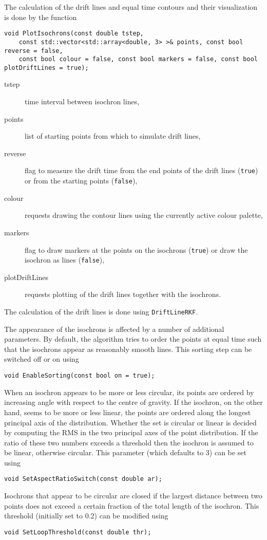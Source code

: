 The calculation of the drift lines and equal time contours and their visualization is 
done by the function 
\begin{lstlisting}
void PlotIsochrons(const double tstep,
    const std::vector<std::array<double, 3> >& points, const bool reverse = false,
    const bool colour = false, const bool markers = false, const bool plotDriftLines = true);
\end{lstlisting}
\begin{description}
  \item[tstep] time interval between isochron lines,
  \item[points] list of starting points from which to simulate drift lines,
  \item[reverse] flag to measure the drift time from the end points of the drift lines (\texttt{true}) or from the starting points (\texttt{false}),
  \item[colour] requests drawing the contour lines using the currently active colour palette,
  \item[markers] flag to draw markers at the points on the isochrons (\texttt{true}) or draw the isochron as lines (\texttt{false}), 
  \item[plotDriftLines] requests plotting of the drift lines together with the isochrons. 
\end{description} 
The calculation of the drift lines is done using \texttt{DriftLineRKF}.

The appearance of the isochrons is affected by a number of additional parameters.
By default, the algorithm tries to order the points at equal time such that 
the isochrons appear as reasonably smooth lines. 
This sorting step can be switched off or on using
\begin{lstlisting}
void EnableSorting(const bool on = true);
\end{lstlisting} 
When an isochron appears to be more or less circular, its points 
are ordered by increasing angle with respect to the centre of gravity. 
If the isochron, on the other hand, seems to be more or less linear, 
the points are ordered along the longest principal axis of the distribution.
Whether the set is circular or linear is decided by computing the RMS 
in the two principal axes of the point distribution. 
If the ratio of these two numbers exceeds a threshold
then the isochron is assumed to be linear, otherwise circular.
This parameter (which defaults to 3) can be set using
\begin{lstlisting}
void SetAspectRatioSwitch(const double ar);
\end{lstlisting}
Isochrons that appear to be circular are closed if the largest distance 
between two points does not exceed a certain fraction of the 
total length of the isochron. 
This threshold (initially set to 0.2) can be modified using
\begin{lstlisting}
void SetLoopThreshold(const double thr);
\end{lstlisting}

